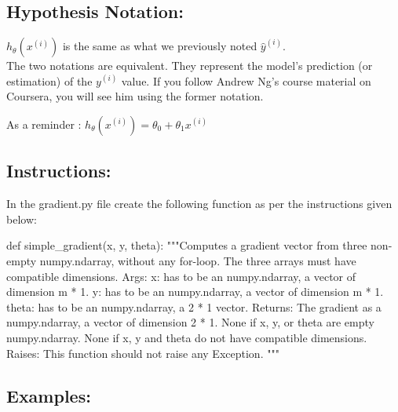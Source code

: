\documentclass[]{article}
\newenvironment{Shaded}{\begin{snugshade}}{\end{snugshade}}
\newcommand{\CommentTok}[1]{\textcolor[rgb]{0.48,0.49,0.49}{#1}}
\newcommand{\KeywordTok}[1]{\textcolor[rgb]{0.81,0.81,0.76}{#1}}
\newcommand{\NormalTok}[1]{\textcolor[rgb]{0.81,0.81,0.76}{#1}}
\begin{document}
\hypertarget{hypothesis-notation}{%
\subsection{Hypothesis Notation:}\label{hypothesis-notation}}

\(h_{\theta}(x^{(i)})\) is the same as what we previously noted
\(\hat{y}^{(i)}\).\\
The two notations are equivalent. They represent the model's prediction
(or estimation) of the \({y}^{(i)}\) value. If you follow Andrew Ng's
course material on Coursera, you will see him using the former notation.

As a reminder : \(h_{\theta}(x^{(i)}) = \theta_0 + \theta_1x^{(i)}\)

\hypertarget{instructions-2}{%
\subsection{Instructions:}\label{instructions-2}}

In the gradient.py file create the following function as per the
instructions given below:

\begin{Shaded}
\begin{Highlighting}[]
\KeywordTok{def}\NormalTok{ simple_gradient(x, y, theta):}
    \CommentTok{"""Computes a gradient vector from three non-empty numpy.ndarray, without any for-loop. The three arrays must have compatible dimensions.}
\CommentTok{    Args:}
\CommentTok{      x: has to be an numpy.ndarray, a vector of dimension m * 1.}
\CommentTok{      y: has to be an numpy.ndarray, a vector of dimension m * 1.}
\CommentTok{      theta: has to be an numpy.ndarray, a 2 * 1 vector.}
\CommentTok{    Returns:}
\CommentTok{      The gradient as a numpy.ndarray, a vector of dimension 2 * 1.}
\CommentTok{      None if x, y, or theta are empty numpy.ndarray.}
\CommentTok{      None if x, y and theta do not have compatible dimensions.}
\CommentTok{    Raises:}
\CommentTok{      This function should not raise any Exception.}
\CommentTok{    """}
\end{Highlighting}
\end{Shaded}

\hypertarget{examples-2}{%
\subsection{Examples:}\label{examples-2}}
\end{document}
